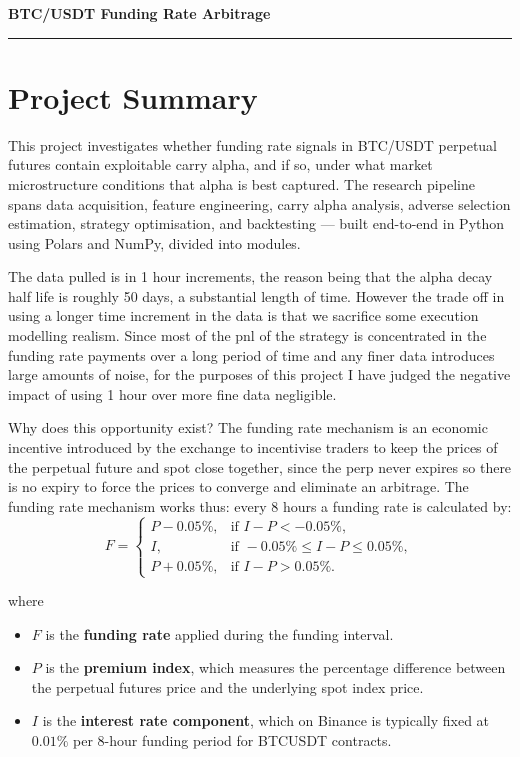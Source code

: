 \documentclass[11pt,a4paper]{article}
\begin{document}
\begin{center}
    {\LARGE \textbf{BTC/USDT Funding Rate Arbitrage}} \\[6pt]
\end{center}

\vspace{4pt}
\hrule
\vspace{12pt}

\section*{Project Summary}

This project investigates whether funding rate signals in BTC/USDT perpetual
futures contain exploitable carry alpha, and if so, under what market
microstructure conditions that alpha is best captured. The research pipeline
spans data acquisition, feature engineering, carry alpha analysis, adverse selection
estimation, strategy optimisation, and backtesting --- built end-to-end in
Python using Polars and NumPy, divided into modules.

The data pulled is in 1 hour increments, the reason being that the alpha decay half life is roughly 50 days, a substantial length of time. However the trade off in using a longer time increment in the data is that we sacrifice some execution modelling realism. Since most of the pnl of the strategy is concentrated in the funding rate payments over a long period of time and any finer data introduces large amounts of noise, for the purposes of this project I have judged the negative impact of using 1 hour over more fine data negligible. 

Why does this opportunity exist? The funding rate mechanism is an economic incentive introduced by the exchange to incentivise traders to keep the prices of the perpetual future and spot close together, since the perp never expires so there is no expiry to force the prices to converge and eliminate an arbitrage. The funding rate mechanism works thus: every 8 hours a funding rate is calculated by: \[
F =
\begin{cases}
P - 0.05\%, & \text{if } I - P < -0.05\%, \\
I, & \text{if } -0.05\% \le I - P \le 0.05\%, \\
P + 0.05\%, & \text{if } I - P > 0.05\%.
\end{cases}
\]

where

\begin{itemize}
    \item $F$ is the \textbf{funding rate} applied during the funding interval.
    \item $P$ is the \textbf{premium index}, which measures the percentage difference between the perpetual futures price and the underlying spot index price. 
    \item $I$ is the \textbf{interest rate component}, which on Binance is typically fixed at $0.01\%$ per 8-hour funding period for BTCUSDT contracts.
\end{itemize}
\end{document}
